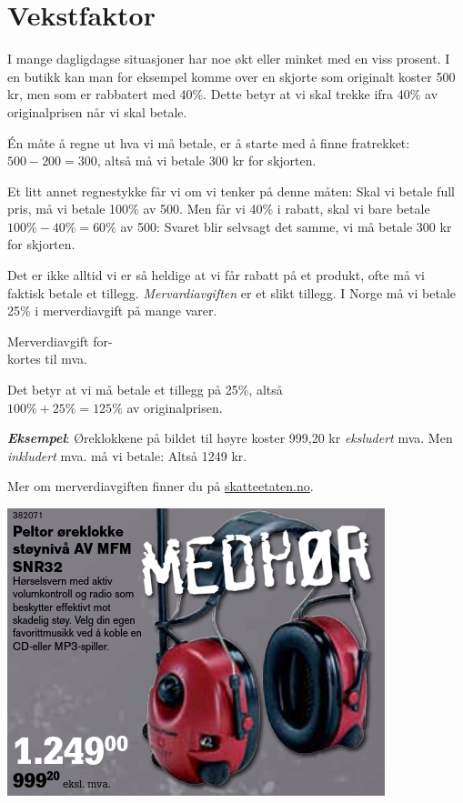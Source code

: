 \section{Vekstfaktor \label{vekstfaktor}}
I mange dagligdagse situasjoner har noe økt eller minket med en viss prosent. I en butikk kan man for eksempel komme over en skjorte som originalt koster 500 kr, men som er rabbatert med 40\%. Dette betyr at vi skal trekke ifra 40\% av originalprisen når vi skal betale.\vsk

Én måte å regne ut hva vi må betale, er å starte med å finne fratrekket:
$ {500-200=300 }$, altså må vi betale 300 kr for skjorten.\vsk

Et litt annet regnestykke får vi om vi tenker på denne måten: Skal vi betale full pris, må vi betale 100\% av 500. Men får vi 40\% i rabatt, skal vi bare betale ${100\%-40\%=60\%}$ av 500:
Svaret blir selvsagt det samme, vi må betale 300 kr for skjorten.\vsk

\parbox[l][][l]{0.6\linewidth}{Det er ikke alltid vi er så heldige at vi får rabatt på et produkt, ofte må vi faktisk betale et tillegg. \textit{Mervardiavgiften} er et slikt tillegg. I Norge må vi betale 25\% i merverdiavgift på mange varer.\vspace{1pt}}\qquad
\parbox[r][][l]{0.3\linewidth}{\begin{shaded}
	Merverdiavgift for-\\kortes til mva.
	\end{shaded}
	}
Det betyr at vi må betale et tillegg på 25\%, altså \\ $100\%+25\%=125\%$ av originalprisen.\vsk

\parbox[l][][l]{0.485\linewidth}{
\textsl{\color{OliveGreen}\textbf{Eksempel}}: Øreklokkene på bildet til høyre koster 999,20 kr \textsl{eksludert} mva. Men \textsl{inkludert} mva. må vi betale:
Altså 1249 kr.\vsk

Mer om merverdiavgiften finner du på \href{http://www.skatteetaten.no/no/Bedrift-og-organisasjon/avgifter/merverdiavgift/}{\color{blue}skatteetaten.no}.
}\quad
\parbox[r][][l]{0.55\linewidth}{
		{\vspace{4pt}
		\includegraphics[scale=0.4]{fig/peltor}}}
\vsk

